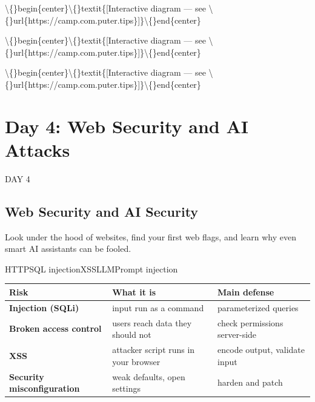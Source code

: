\documentclass[12pt,openany]{book}
\begin{document}
\textbackslash\{\}begin\{center\}\textbackslash\{\}textit\{[Interactive diagram --- see \textbackslash\{\}url\{https://camp.com.puter.tips\}]\}\textbackslash\{\}end\{center\}



\textbackslash\{\}begin\{center\}\textbackslash\{\}textit\{[Interactive diagram --- see \textbackslash\{\}url\{https://camp.com.puter.tips\}]\}\textbackslash\{\}end\{center\}









\textbackslash\{\}begin\{center\}\textbackslash\{\}textit\{[Interactive diagram --- see \textbackslash\{\}url\{https://camp.com.puter.tips\}]\}\textbackslash\{\}end\{center\}









\chapter{Day 4: Web Security and AI Attacks}
DAY 4


\section*{Web Security and AI Security}


Look under the hood of websites, find your first web flags, and learn why even smart AI assistants can be fooled.


HTTPSQL injectionXSSLLMPrompt injection









\begin{center}\small\begin{tabular}{p{4.3cm}p{4.3cm}p{4.3cm}}\toprule
\textbf{Risk} & \textbf{What it is} & \textbf{Main defense} \\ \midrule
\textbf{Injection (SQLi)} & input run as a command & parameterized queries \\
\textbf{Broken access control} & users reach data they should not & check permissions server-side \\
\textbf{XSS} & attacker script runs in your browser & encode output, validate input \\
\textbf{Security misconfiguration} & weak defaults, open settings & harden and patch \\
\bottomrule\end{tabular}\end{center}
\end{document}
